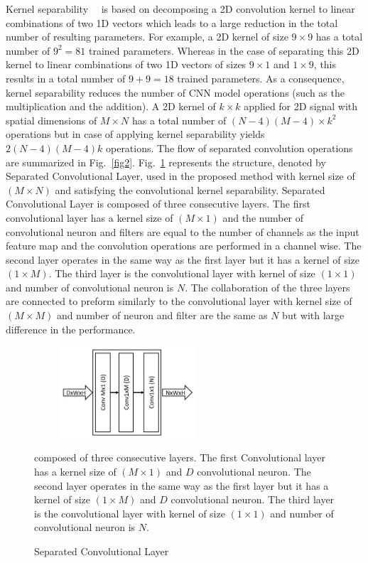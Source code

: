     
Kernel separability~\cite{rigamonti2013learning}~\cite{szegedy2017inception} is based on decomposing a 2D convolution kernel to linear combinations of two 1D vectors which leads to a large reduction in  the total number of resulting parameters. For example, a 2D kernel of size $9 \times 9$ has a total number of $9^2 = 81$  trained parameters. Whereas in the case of separating this 2D kernel to  linear combinations of two 1D vectors of sizes $9 \times 1$ and $1 \times 9$, this results in a total number of  $9 + 9 = 18$ trained parameters. As a consequence, kernel separability reduces the number of CNN model operations (such as the multiplication and the addition). A  2D kernel of $k \times k$ applied for 2D signal with spatial dimensions of $ M \times N$ has a total number of  $(N-4)(M-4)\times k^2$ operations but in case of  applying kernel separability  yields $2(N-4)(M-4)k$ operations. The flow of separated convolution operations are summarized in Fig.~\ref{fig2}. Fig.~\ref{fig3} represents the structure, denoted by Separated Convolutional Layer, used in the proposed method with kernel size of $(M\times N)$ and satisfying the convolutional kernel separability. Separated Convolutional Layer is composed of three consecutive layers. The first convolutional layer has a kernel size of $(M\times1)$ and the number of convolutional neuron and  filters are equal to the number of channels as the input feature map and the convolution operations are performed in a channel wise. The second layer  operates in the same way as the first layer but it has a kernel of size $(1\times M)$. The third layer is the convolutional layer with kernel of size $(1\times1)$ and number of convolutional neuron is $N$. The collaboration of the three layers are  connected to preform similarly to the convolutional layer with kernel size of $(M\times M)$ and number of neuron and filter are the same as $N$ but with large difference in the performance.


\begin{figure}
    \begin{center}
    \includegraphics[height=34mm,width=7.0cm]{Figures/fig3.jpg}
    \caption{Separated Convolutional Layer}{ composed of three consecutive layers. The first Convolutional layer has a kernel size of $(M\times1)$ and $D$  convolutional neuron. The second layer  operates in the same way as the first layer but it has a kernel of size $(1\times M)$ and $D$ convolutional neuron. The third layer is the convolutional layer with kernel of size $(1\times1)$ and number of convolutional neuron is $N$.}
    \label{fig3}
    \end{center}
    \end{figure}

